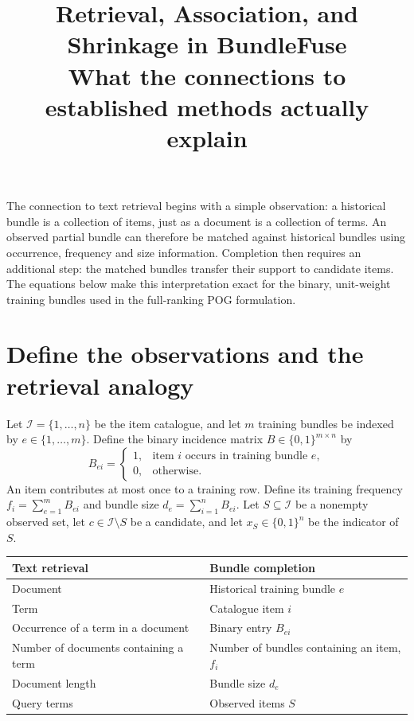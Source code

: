 \documentclass[11pt,a4paper]{article}
\title{Retrieval, Association, and Shrinkage in BundleFuse\\
\large What the connections to established methods actually explain}
\author{}\date{}
\begin{document}
\maketitle

The connection to text retrieval begins with a simple observation: a historical
bundle is a collection of items, just as a document is a collection of terms.
An observed partial bundle can therefore be matched against historical bundles
using occurrence, frequency and size information. Completion then requires an
additional step: the matched bundles transfer their support to candidate items.
The equations below make this interpretation exact for the binary, unit-weight
training bundles used in the full-ranking POG formulation.

\section{Define the observations and the retrieval analogy}
Let $\mathcal I=\{1,\ldots,n\}$ be the item catalogue, and let $m$ training
bundles be indexed by $e\in\{1,\ldots,m\}$. Define the binary incidence matrix
$B\in\{0,1\}^{m\times n}$ by
\[
 B_{ei}=\begin{cases}1,&\text{item $i$ occurs in training bundle $e$},\\
 0,&\text{otherwise}.
 \end{cases}
\]
An item contributes at most once to a training row. Define its training frequency
$f_i=\sum_{e=1}^mB_{ei}$ and bundle size $d_e=\sum_{i=1}^nB_{ei}$.
Let $S\subseteq\mathcal I$ be a nonempty observed set, let $c\in\mathcal I\setminus S$
be a candidate, and let $x_S\in\{0,1\}^n$ be the indicator of $S$.

\begin{center}
\begin{tabularx}{\linewidth}{@{}XX@{}}\toprule
Text retrieval & Bundle completion \\\midrule
Document & Historical training bundle $e$ \\
Term & Catalogue item $i$ \\
Occurrence of a term in a document & Binary entry $B_{ei}$ \\
Number of documents containing a term & Number of bundles containing an item, $f_i$ \\
Document length & Bundle size $d_e$ \\
Query terms & Observed items $S$ \\\bottomrule
\end{tabularx}
\end{center}
\end{document}
